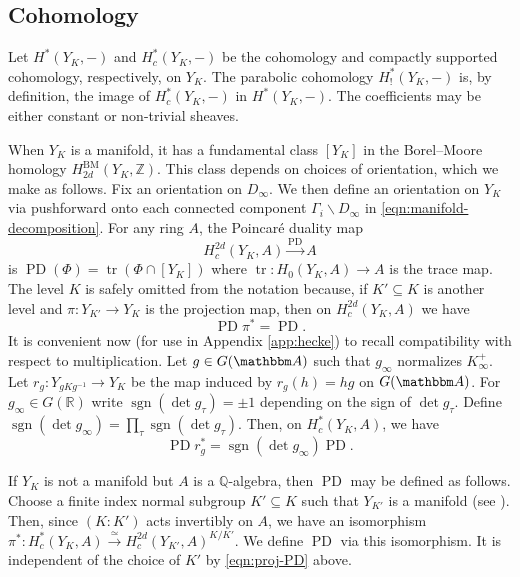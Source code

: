 \documentclass[10pt, twoside]{amsart}
\theoremstyle{plain}
\theoremstyle{definition}
\theoremstyle{remark}
\numberwithin{equation}{subsection}
\def\Q{\mathbb Q}
\def\Z{\mathbb Z}
\def\R{\mathbb R}
\def\A{\mathbbm A}
\def\PD{\operatorname{PD}}
\def\BM{\mathrm{BM}}
\def\tr{\operatorname{tr}}
\newcommand{\sgn}{\operatorname{sgn}}
\begin{document}
\subsection{Cohomology}\label{subsec:cohomology}

Let $H^\ast(Y_K,-)$ and $H^\ast_c (Y_K  ,-)$ be the  cohomology and compactly supported cohomology, respectively, on $Y_K$. The parabolic cohomology  $H^\ast_!(Y _K,-)$ is, by definition, the image of $H^\ast_c(Y_K, -)$ in $H^\ast (Y_K,-)$. The coefficients may be either constant or non-trivial sheaves.

When $Y_K$ is a manifold, it has a fundamental class $[Y_K]$ in the Borel--Moore homology $H_{2d}^{\BM}(Y_K,\Z)$. This class depends on choices of orientation, which we make as follows. Fix an orientation on $D_\infty$. We then define an orientation on $Y_K$ via pushforward onto each connected component $\Gamma_i\backslash D_\infty$ in \eqref{eqn:manifold-decomposition}. For any ring $A$, the Poincar\'e duality map
\begin{equation}\label{eqn:PD}
H^{2d}_c(Y_K,A) \xrightarrow{\PD} A
\end{equation}
is $\PD(\Phi) = \tr(\Phi \cap [Y_K])$ where $\tr : H_0(Y_K,A) \rightarrow A$ is the trace map. The level $K$ is safely omitted from the notation because, if $K' \subseteq K$ is another level and $\pi: Y_{K'} \rightarrow Y_K$ is the projection map, then on $H^{2d}_c(Y_K,A)$ we have
\begin{equation}\label{eqn:proj-PD}
\PD\pi^{\ast} = \PD.
\end{equation}
It is convenient now (for use in Appendix \ref{app:hecke}) to recall compatibility with respect to multiplication. Let $g \in G(\A)$ such that $g_\infty$ normalizes $K_\infty^+$. Let $r_g : Y_{gKg^{-1}} \rightarrow Y_K$ be the map induced by $r_g(h)=hg$ on $G(\A)$. For $g_\infty \in G(\R)$ write $\sgn(\det g_\tau) = \pm 1$ depending on the sign of $\det g_\tau$. Define $\sgn(\det g_\infty) = \prod_\tau \sgn(\det g_\tau)$. Then, on $H^{\ast}_c(Y_K,A)$, we have
\begin{equation}\label{eqn:rg-PD}
\PD r_g^{\ast} = \sgn(\det g_\infty)\PD.
\end{equation}

If $Y_K$ is not a manifold but $A$ is a $\Q$-algebra, then $\PD$ may be defined as follows. Choose a finite index normal subgroup $K' \subseteq K$ such that $Y_{K'}$ is a manifold (see \cite[p.\ 340]{Hida}). Then, since $(K:K')$ acts invertibly on $A$, we have an isomorphism $\pi^{\ast} : H^{\ast}_c(Y_K,A) \xrightarrow{\simeq} H^{2d}_c(Y_{K'},A)^{K/K'}$. We define $\PD$ via this isomorphism. It is independent of the choice of $K'$ by  \eqref{eqn:proj-PD} above.
\end{document}
